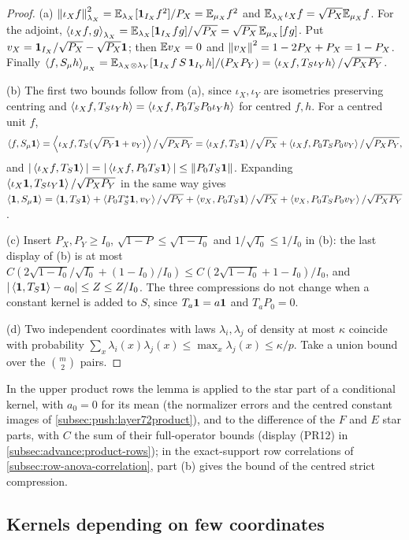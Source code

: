\begin{proof}
(a) $\left\|\iota_Xf\right\|^2_{\lambda_X}=\mathbb E_{\lambda_X}[\mathbf 1_{I_X}f^2]/P_X=\mathbb E_{\mu_X}f^2$
and $\mathbb E_{\lambda_X}\iota_Xf=\sqrt{P_X}\mathbb E_{\mu_X}f$. For the adjoint,
$\left\langle \iota_Xf,g\right\rangle_{\lambda_X}=\mathbb E_{\lambda_X}[\mathbf 1_{I_X}fg]/\sqrt{P_X}=\sqrt{P_X}\,\mathbb E_{\mu_X}[fg]$.
Put $v_X=\mathbf 1_{I_X}/\sqrt{P_X}-\sqrt{P_X}\mathbf 1$; then $\mathbb E v_X=0$ and
$\left\|v_X\right\|^2=1-2P_X+P_X=1-P_X$. Finally
$\left\langle f,S_\mu h\right\rangle_{\mu_X}=\mathbb E_{\lambda_X\otimes\lambda_Y}[\mathbf 1_{I_X}f\,S\,\mathbf 1_{I_Y}h]/(P_XP_Y)
=\left\langle \iota_Xf,T_S\iota_Yh\right\rangle/\sqrt{P_XP_Y}$.

(b) The first two bounds follow from (a), since $\iota_X,\iota_Y$ are isometries
preserving centring and $\left\langle \iota_Xf,T_S\iota_Yh\right\rangle=\left\langle \iota_Xf,P_0T_SP_0\iota_Yh\right\rangle$
for centred $f,h$. For a centred unit $f$,
\[
  \left\langle f,S_\mu\mathbf 1\right\rangle=\left\langle \iota_Xf,T_S(\sqrt{P_Y}\mathbf 1+v_Y)\right\rangle/\sqrt{P_XP_Y}
  =\left\langle \iota_Xf,T_S\mathbf 1\right\rangle/\sqrt{P_X}+\left\langle \iota_Xf,P_0T_SP_0v_Y\right\rangle/\sqrt{P_XP_Y},
\]
and $|\left\langle \iota_Xf,T_S\mathbf 1\right\rangle|=|\left\langle \iota_Xf,P_0T_S\mathbf 1\right\rangle|\le\left\|P_0T_S\mathbf 1\right\|$.
Expanding $\left\langle \iota_X\mathbf 1,T_S\iota_Y\mathbf 1\right\rangle/\sqrt{P_XP_Y}$ in the same way gives
$\left\langle \mathbf 1,S_\mu\mathbf 1\right\rangle=\left\langle \mathbf 1,T_S\mathbf 1\right\rangle+\left\langle P_0T_S^*\mathbf 1,v_Y\right\rangle/\sqrt{P_Y}
+\left\langle v_X,P_0T_S\mathbf 1\right\rangle/\sqrt{P_X}+\left\langle v_X,P_0T_SP_0v_Y\right\rangle/\sqrt{P_XP_Y}$.

(c) Insert $P_X,P_Y\ge I_0$, $\sqrt{1-P}\le\sqrt{1-I_0}$ and $1/\sqrt{I_0}\le1/I_0$
in (b): the last display of (b) is at most
$C(2\sqrt{1-I_0}/\sqrt{I_0}+(1-I_0)/I_0)\le C(2\sqrt{1-I_0}+1-I_0)/I_0$, and
$|\left\langle \mathbf 1,T_S\mathbf 1\right\rangle-a_0|\le Z\le Z/I_0$. The three compressions do not change
when a constant kernel is added to $S$, since $T_a\mathbf 1=a\mathbf 1$ and $T_aP_0=0$.

(d) Two independent coordinates with laws $\lambda_i,\lambda_j$ of density at
most $\kappa$ coincide with probability
$\sum_x\lambda_i(x)\lambda_j(x)\le\max_x\lambda_j(x)\le\kappa/p$. Take a union
bound over the $\binom m2$ pairs.
\end{proof}

In the upper product rows the lemma is applied to the star part of a
conditional kernel, with $a_0=0$ for its mean (the normalizer errors and the
centred constant images of \cref{subsec:push:layer72product}), and to the
difference of the $F$ and $E$ star parts, with $C$ the sum of their
full-operator bounds (display (PR12) in
\cref{subsec:advance:product-rows}); in the
exact-support row correlations of \cref{subsec:row-anova-correlation}, part (b)
gives the bound of the centred strict compression.

\subsection{Kernels depending on few coordinates}\label{subsec:cuts:projection}

